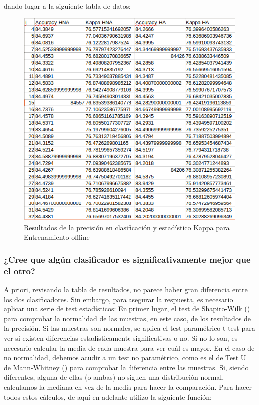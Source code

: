 dando lugar a la siguiente tabla de datos:
\begin{figure}[H] %
	\centering
	\includegraphics[scale=0.45]{ejercicio-offline.png}  %
	\caption{Resultados de la precisión en clasificación y estadístico Kappa para Entrenamiento offline} 
	\label{fig:off3}
\end{figure}

\subsubsection{¿Cree que algún clasificador es significativamente mejor que el otro?}

A priori, revisando la tabla de resultados, no parece haber gran diferencia entre los dos clasificadores. Sin embargo, para asegurar la respuesta, es necesario aplicar una serie de test estadísticos: En primer lugar, el test de Shapiro-Wilk (\cite{sw}) para comprobar la normalidad de las muestras, en este caso, de los resultados de la precisión. Si las muestras son normales, se aplica el test paramétrico t-test para ver si existen diferencias estadísticamente significativas o no. Si no lo son, es necesario calcular la media de cada muestra para ver cuál es mayor. En el caso de no normalidad, debemos acudir a un test no paramétrico, como es el de Test U de Mann-Whitney (\cite{umw}) para comprobar la diferencia entre las muestras. Si, siendo diferentes, alguna de ellas (o ambas) no siguen una distribución normal, calculamos la mediana en vez de la media para hacer la comparación. Para hacer todos estos cálculos, de aquí en adelante utilizo la siguiente función:

